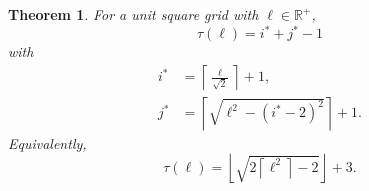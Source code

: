 \documentclass[12pt, a4paper]{article}
\newcommand{\funt}{\tau} %
\newcommand{\len}{\ell} %
\newcommand{\isoli}{i^\ast}
\newcommand{\jsoli}{j^\ast}
\newtheorem{theorem}{Theorem}%
\begin{document}
\begin{theorem}
\label{theo: funt, sq, form}
For a unit square grid with $\len \in \mathbb R^+$,
\begin{equation}
\label{eq: theo: funt, sq, form; funt, with i, j}
\funt(\len) = \isoli+\jsoli-1
\end{equation}
with
\begin{align}
\label{eq: theo: funt, sq, form; i}
\isoli &= \left\lceil \frac{\len}{\sqrt{2}} \right\rceil + 1, \\
\label{eq: theo: funt, sq, form; j}
\jsoli &= \left\lceil \sqrt{\len^2-(\isoli-2)^2} \right\rceil + 1.
\end{align}
Equivalently,
\begin{equation}
\label{eq: theo: funt, sq, form; funt, simpler}
\funt(\len) = \left\lfloor \sqrt{2 \left\lceil \len^2 \right\rceil - 2} \right\rfloor + 3.
\end{equation}
\end{theorem}
\end{document}
